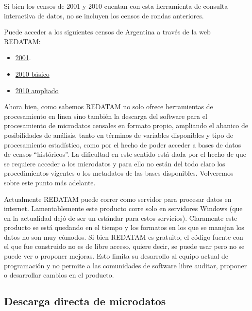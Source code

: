 \documentclass[
]{book}
\providecommand{\tightlist}{%
  \setlength{\itemsep}{0pt}\setlength{\parskip}{0pt}}
\begin{document}
Si bien los censos de 2001 y 2010 cuentan con esta herramienta de consulta interactiva de datos, no se incluyen los censos de rondas anteriores.

Puede acceder a los siguientes censos de Argentina a través de la web REDATAM:

\begin{itemize}
\tightlist
\item
  \href{https://redatam.indec.gob.ar/argbin/RpWebEngine.exe/PortalAction?\&MODE=MAIN\&BASE=CPV2001ARG\&MAIN=WebServerMain.inl\&_ga=2.209433750.505137327.1603741558-822725481.1603741558}{2001}.
\item
  \href{https://redatam.indec.gob.ar/argbin/RpWebEngine.exe/PortalAction?\&MODE=MAIN\&BASE=CPV2010B\&MAIN=WebServerMain.inl\&_ga=2.251878541.505137327.1603741558-822725481.1603741558}{2010 básico}
\item
  \href{https://redatam.indec.gob.ar/argbin/RpWebEngine.exe/PortalAction?\&MODE=MAIN\&BASE=CPV2010A\&MAIN=WebServerMain.inl\&_ga=2.248606851.505137327.1603741558-822725481.1603741558}{2010 ampliado}
\end{itemize}

Ahora bien, como sabemos REDATAM no solo ofrece herramientas de procesamiento en línea sino también la descarga del software para el procesamiento de microdatos censales en formato propio, ampliando el abanico de posibilidades de análisis, tanto en términos de variables disponibles y tipo de procesamiento estadístico, como por el hecho de poder acceder a bases de datos de censos ``históricos''. La dificultad en este sentido está dada por el hecho de que se requiere acceder a los microdatos y para ello no están del todo claro los procedimientos vigentes o los metadatos de las bases disponibles. Volveremos sobre este punto más adelante.

Actualmente REDATAM puede correr como servidor para procesar datos en internet. Lamentablemente este producto corre solo en servidores Windows (que en la actualidad dejó de ser un estándar para estos servicios). Claramente este producto se está quedando en el tiempo y los formatos en los que se manejan los datos no son muy cómodos. Si bien REDATAM es gratuito, el código fuente con el que fue construido no es de libre acceso, quiere decir, se puede usar pero no se puede ver o proponer mejoras. Esto limita su desarrollo al equipo actual de programación y no permite a las comunidades de software libre auditar, proponer o desarrollar cambios en el producto.

\hypertarget{descarga-directa-de-microdatos}{%
\subsection{Descarga directa de microdatos}\label{descarga-directa-de-microdatos}}
\end{document}
